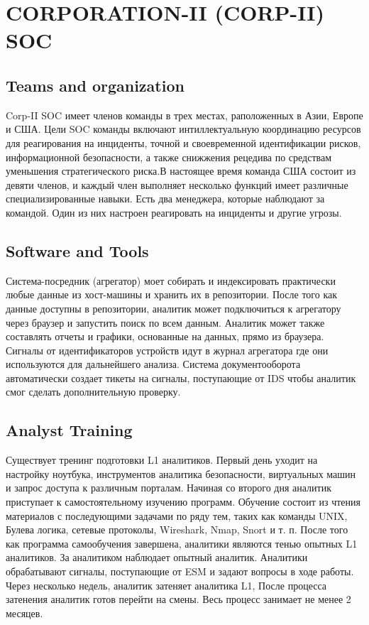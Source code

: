 \documentclass[12pt,]{article}
\begin{document}
\section{CORPORATION-II (CORP-II) SOC}
\subsection{Teams and organization}
Corp-II SOC имеет членов команды в трех местах, раположенных в Азии, Европе и США. Цели SOC команды включают интиллектуальную координацию ресурсов для реагирования на инциденты, точной и своевременной идентификации рисков, информационной безопасности, а также снижжения рецедива по средствам уменьшения стратегического риска.В настоящее время команда США  состоит из девяти членов, и каждый член выполняет несколько функций имеет различные специализированные навыки. Есть два менеджера, которые наблюдают за командой. Один из них настроен реагировать на инциденты и другие угрозы.
\subsection{Software and Tools}
Система-посредник (агрегатор) моет собирать и индексировать практически любые данные из хост-машины и хранить их в репозитории. После того как данные доступны в репозитории, аналитик может подключиться к агрегатору через браузер и запустить поиск по всем данным. Аналитик может также составлять отчеты и графики, основанные на данных, прямо из браузера. Сигналы от идентификаторов устройств идут в журнал агрегатора где они используются для дальнейшего анализа.  Система документооборота автоматически создает тикеты на сигналы, поступающие от IDS чтобы аналитик смог сделать дополнительную проверку.
\subsection{Analyst Training}
Существует тренинг подготовки L1 аналитиков. Первый день уходит на настройку ноутбука, инструментов аналитика безопасности, виртуальных машин и запрос доступа к различным порталам. Начиная со второго дня аналитик приступает к самостоятельному изучению программ. Обучение состоит из чтения материалов с последующими задачами по ряду тем, таких как команды UNIX, Булева логика, сетевые протоколы, Wireshark, Nmap, Snort и т. п. После того как программа самообучения завершена, аналитики являются тенью опытных L1 аналитиков. За аналитиком наблюдает опытный аналитик. Аналитики обрабатывают сигналы, поступающие от ESM и задают вопросы в ходе работы. Через несколько недель, аналитик затеняет аналитика L1, После процесса затенения аналитик готов перейти на смены. Весь процесс занимает не менее 2 месяцев.
\end{document}

